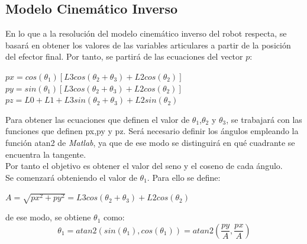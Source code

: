 \subsection{Modelo Cinemático Inverso}



En lo que a la resolución del modelo cinemático inverso del robot respecta, se basará en obtener los valores de las variables articulares a partir de la posición del efector final. Por tanto, se partirá de las ecuaciones del vector $p$:



\begin{center}
	
	$px=cos(\theta_{1})[L3cos(\theta_{2}+\theta_{3}) + L2cos(\theta_{2})]$ \\
	
	$py=sin(\theta_{1})[L3cos(\theta_{2}+\theta_{3}) + L2cos(\theta_{2})]$ \\
	
	$pz=L0 + L1 + L3sin(\theta_{2}+\theta_{3}) + L2sin(\theta_{2})$
	
\end{center}



Para obtener las ecuaciones que definen el valor de $\theta_{1}$,$\theta_{2}$ y $\theta_{3}$, se trabajará con las funciones que definen px,py y pz. Será necesario definir los ángulos empleando la función atan2 de \textit{Matlab}, ya que de ese modo se distinguirá en qué cuadrante se encuentra la tangente.\\

Por tanto el objetivo es obtener el valor del seno y el coseno de cada ángulo.\\



Se comenzará obteniendo el valor de $\theta_{1}$. Para ello se define:\\

\begin{center}
	
	$ A = \sqrt{px^{2}+py^{2}} = L3cos(\theta_{2}+\theta_{3}) + L2cos(\theta_{2})$
	
\end{center}

de ese modo, se obtiene $\theta_{1}$ como:\\

\begin{equation}
\theta_{1}=atan2(sin(\theta_{1}),cos(\theta_{1}))=atan2(\frac{py}{A},\frac{px}{A})
\end{equation}

